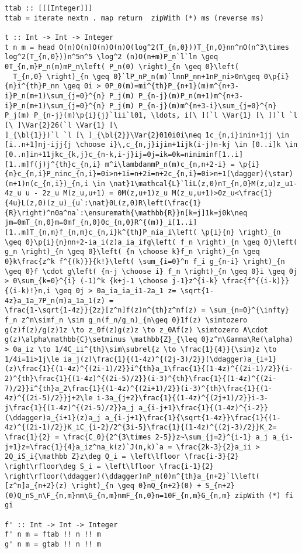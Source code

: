 \documentclass{jfp1}
\newcommand{\nat}{\ensuremath{\mathbb{N}}}
\newcommand{\F}{\mathcal{F}}
\newcommand{\G}{\mathcal{G}}
\newcommand{\Var}[1]{\underline{\mathsf{#1}}}
\newcommand{\p}[2]{p^{[#1]}_{#2}}
\newcommand\subrel[2]{\mathrel{\mathop{#2}\limits_{#1}}}
\newcommand{\simtozero}{\subrel{z \to z_0}{\sim}}
\newcommand{\bl}[1]{\textcolor{blue}{#1}}
\begin{document}
\begin{verbatim}
ttab :: [[[Integer]]]
ttab = iterate nextn . map return  zipWith (*) ms (reverse ms)
  
t :: Int -> Int -> Integer
t n m = head O(n)O(n)O(n)O(n)O(log^2(T_{n,0}))T_{n,0}nn^nO(n^3\times log^2(T_{n,0}))n^5n^5 \log^2 (n)O(n+m)P_n`l`ln \geq 0T_{n,m}P_n(m)mP_n\left( P_n(0) \right)_{n \geq 0}\left(
  T_{n,0} \right)_{n \geq 0}`lP_nP_n(m)`lnnP_nn+1nP_ni>0n\geq 0\p{i}{n}i^{th}P_nn \geq 0i > 0P_0(m)=mi^{th}P_{n+1}(m)m^{n+3-i}P_n(m+1)\sum_{j=0}^{n} P_j(m) P_{n-j}(m)P_n(m+1)m^{n+3-i}P_n(m+1)\sum_{j=0}^{n} P_j(m) P_{n-j}(m)m^{n+3-i}\sum_{j=0}^{n} P_j(m) P_{n-j}(m)\p{i}{j}`lii`l01, \ldots, i[\ ](`l \Var{1} [\ ])`l `l [\ ]\Var{2}26(`l \Var{1} [\
]_{\bl{1}})`l `l [\ ]_{\bl{2}}\Var{2}010i0i\neq 1c_{n,i}inin+1jj \in [i..n+1]nj-ijj{j \choose i}\,c_{n,j}ijin+1ijk(i-j)n-kj \in [0..i]k \in [0..n]in+11jkc_{k,j}c_{n-k,i-j}ij=0j=ik=0k=niniminf[1..i][1..m]f(j)j^{th}c_{n,i} m^i\lambdanmP_n(m)c_{n,n+2-i} = \p{i}{n}c_{n,i}P_ninc_{n,i}=0i>n+1i=n+2i=n+2c_{n,i}=0i>n+1(\dagger)(\star)(n+1)n(c_{n,i})_{n,i \in \nat}1\mathcal{L}`liL(z,0)nT_{n,0}M(z,u)z_u1-4z_u u - 2z_u M(z_u,u+1) = 0M(z,u+1)z_u M(z_u,u+1)>0z_u<\frac{1}{4u}L(z,0)(z_u)_{u`:\nat}0L(z,0)R\left(\frac{1}{R}\right)^n0a^na`:\ensuremath{\mathbb{R}}n[k=j]1k=j0k\neq jm=0mT_{n,0}m=0mf_{n,0}0c_{n,0}R^{(m)}_i[1..i][1..m]T_{n,m}f_{n,m}c_{n,i}k^{th}P_nia_i\left( \p{i}{n} \right)_{n \geq 0}\p{i}{n}nn+2-ia_i(z)a_ia_ifg\left( f_n \right)_{n \geq 0}\left( g_n \right)_{n \geq 0}\left( {n \choose k}f_n \right)_{n \geq 0}k\frac{z^k f^{(k)}}{k!}\left( \sum_{i=0}^n f_i g_{n-i} \right)_{n \geq 0}f \cdot g\left( {n-j \choose i} f_n \right)_{n \geq 0}i \geq 0j > 0\sum_{k=0}^{i} (-1)^k {k+j-1 \choose j-1}z^{i-k} \frac{f^{(i-k)}}{(i-k)!}n,i \geq 0j > 0a_ia_ia_i1-2a_1 z= \sqrt{1-4z}a_1a_7P_n(m)a_1a_1(z) =
\frac{1-\sqrt{1-4z}}{2z}[z^n]f(z)n^{th}z^nf(z) = \sum_{n=0}^{\infty} f_n z^n\simf_n \sim g_n(f_n/g_n)_{n\geq 0}1f(z) \simtozero g(z)f(z)/g(z)1z \to z_0f(z)g(z)z \to z_0Af(z) \simtozero A\cdot g(z)\alpha\mathbb{C}\setminus \mathbb{Z}_{\leq 0}z^n\Gamma\Re(\alpha) > 0a_iz \to 1/4C_ii^{th}\sim\subrel{z \to \frac{1}{4}}{\sim}z \to 1/4i=1i>1j\le ia_j(z)\frac{1}{(1-4z)^{(2j-3)/2}}(\ddagger)a_{i+1}(z)\frac{1}{(1-4z)^{(2i-1)/2}}i^{th}a_1\frac{1}{(1-4z)^{(2i-1)/2}}(i-2)^{th}\frac{1}{(1-4z)^{(2i-5)/2}}(i-3)^{th}\frac{1}{(1-4z)^{(2i-7)/2}}i^{th}a_2\frac{1}{(1-4z)^{(2i+1)/2}}(i-3)^{th}\frac{1}{(1-4z)^{(2i-5)/2}}j+2\le i-3a_{j+2}\frac{1}{(1-4z)^{(2j+1)/2}}i-3-j\frac{1}{(1-4z)^{(2i-5)/2}}a_j a_{i-j+1}\frac{1}{(1-4z)^{i-2}}(\ddagger)a_{i+1}(z)a_j a_{i-j+1}\frac{1}{\sqrt{1-4z}}\frac{1}{(1-4z)^{(2i-1)/2}}K_iC_{i-2}/2^{3i-5}\frac{1}{(1-4z)^{(2j-3)/2}}K_2= \frac{1}{2} = \frac{C_0}{2^{3\times 2-5}}z~\sum_{j=2}^{i-1} a_j a_{i-j+1}z=\frac{1}{4}a_iz^na_k(z)`J(n,k)`a = \frac{2k-3}{2}a_ii > 2Q_iS_i{\mathbb Z}z\deg Q_i = \left\lfloor \frac{i-3}{2} \right\rfloor\deg S_i = \left\lfloor \frac{i-1}{2} \right\rfloor(\ddagger)(\ddagger)nP_n(0)n^{th}a_{n+2}`l\left( [z^n]a_{n+2}(z) \right)_{n \geq 0}nQ_{n+2}(0) + S_{n+2}(0)Q_nS_n\F_{n,m}nm\G_{n,m}nmF_{n,0}n=10F_{n,m}G_{n,m} zipWith (*) fi gi
 
f' :: Int -> Int -> Integer
f' n m = ftab !! n !! m
g' n m = gtab !! n !! m
\end{verbatim}
\end{document}

